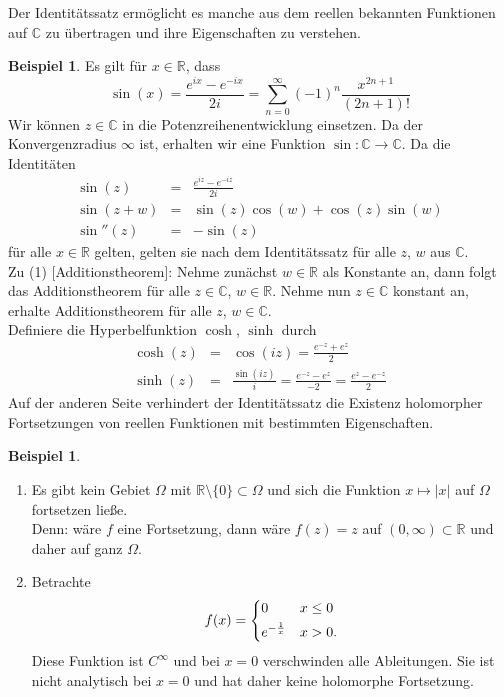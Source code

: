 \documentclass[11pt,titlepage]{article}
\theoremstyle{definition}
\newtheorem{example}[theorem]{Beispiel}
\theoremstyle{remark}
\begin{document}
	Der Identitätssatz ermöglicht es manche aus dem reellen bekannten Funktionen auf $\mathbb{C}$ 
	zu übertragen und ihre Eigenschaften zu verstehen.
	
	\begin{example}\label{bsp:sin}
		Es gilt für $x\in\mathbb{R}$, dass
		\[ \sin(x)=\frac{e^{ix}-e^{-ix}}{2i}=\sum_{n=0}^{\infty}(-1)^n \frac{x^{2n+1}}{(2n+1)!} \]
		Wir können $z\in\mathbb{C}$ in die Potenzreihenentwicklung einsetzen. Da der 
		Konvergenzradius $\infty$ ist, erhalten wir eine Funktion $\sin:\mathbb{C}\to\mathbb{C}$. 
		Da die Identitäten 
		\begin{eqnarray}
			\sin(z)&=&\frac{e^{iz}-e^{-iz}}{2i} \nonumber \\
			\sin(z+w)&=&\sin(z)\cos(w)+\cos(z)\sin(w) \\
			\sin''(z)&=&-\sin(z) \nonumber
		\end{eqnarray}
		für alle $x\in\mathbb{R}$ gelten, gelten sie nach dem Identitätssatz für alle $z$, $w$ aus 
		$\mathbb{C}$. \\
		Zu (1) [Additionstheorem]: Nehme zunächst $w\in\mathbb{R}$ als Konstante an, dann folgt das 
		Additionstheorem für alle $z\in\mathbb{C}$, $w\in\mathbb{R}$. Nehme nun $z\in\mathbb{C}$ 
		konstant an, erhalte Additionstheorem für alle $z$, $w\in\mathbb{C}$. \\
		Definiere die Hyperbelfunktion $\cosh$, $\sinh$ durch
		\begin{eqnarray*}
			\cosh(z)&=&\cos(iz)=\frac{e^{-z}+e^z}{2} \\
			\sinh(z)&=&\frac{\sin(iz)}{i}=\frac{e^{-z}-e^z}{-2} =\frac{e^z -e^{-z}}{2}
		\end{eqnarray*}
		Auf der anderen Seite verhindert der Identitätssatz die Existenz holomorpher Fortsetzungen 
		von reellen Funktionen mit bestimmten Eigenschaften.
	\end{example}
	
	\begin{example}
		\begin{enumerate}
			\item Es gibt kein Gebiet $\Omega$ mit $\mathbb{R}\setminus\{0\}\subset\Omega$ 
			und sich die Funktion $x\mapsto |x|$ auf $\Omega$ fortsetzen ließe. \\
			Denn: wäre $f$ eine Fortsetzung, dann wäre $f(z)=z$ auf $(0,\infty)\subset\mathbb{R}$ 
			und daher auf ganz $\Omega$.
			\item Betrachte 
			\[ f(x)=\begin{dcases} 0 & x\leq 0 \\ e^{-\frac{1}{x}} & x>0. \end{dcases} \]
			Diese Funktion ist $C^{\infty}$ und bei $x=0$ verschwinden alle Ableitungen. Sie ist nicht 
			analytisch bei $x=0$ und hat daher keine holomorphe Fortsetzung.
		\end{enumerate}
	\end{example}
	
\end{document}
